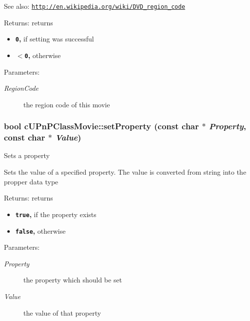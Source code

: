\begin{Desc}
\item[See also:]\href{http://en.wikipedia.org/wiki/DVD_region_code}{\tt http://en.wikipedia.org/wiki/DVD\_\-region\_\-code} \end{Desc}
\begin{Desc}
\item[Returns:]returns\begin{itemize}
\item {\bf {\tt 0},} if setting was successful\item {\bf {\tt $<$0},} otherwise \end{itemize}
\end{Desc}
\begin{Desc}
\item[Parameters:]
\begin{description}
\item[{\em RegionCode}]the region code of this movie \end{description}
\end{Desc}
\hypertarget{classcUPnPClassMovie_d7f990edda85f2caabe822d2ceeb2b0d}{
\subsubsection[{setProperty}]{\setlength{\rightskip}{0pt plus 5cm}bool cUPnPClassMovie::setProperty (const char $\ast$ {\em Property}, \/  const char $\ast$ {\em Value})}}
\label{classcUPnPClassMovie_d7f990edda85f2caabe822d2ceeb2b0d}


Sets a property

Sets the value of a specified property. The value is converted from string into the propper data type

\begin{Desc}
\item[Returns:]returns\begin{itemize}
\item {\bf {\tt true},} if the property exists\item {\bf {\tt false},} otherwise \end{itemize}
\end{Desc}
\begin{Desc}
\item[Parameters:]
\begin{description}
\item[{\em Property}]the property which should be set \item[{\em Value}]the value of that property \end{description}
\end{Desc}


